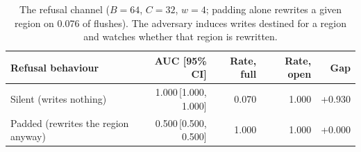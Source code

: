 \begin{table}[t]
\centering
\caption{The refusal channel ($B=64$, $C=32$, $w=4$;
padding alone rewrites a given region on 0.076 of flushes). The adversary
induces writes destined for a region and watches whether that region is rewritten.}
\label{tab:e9}
\small
\setlength{\tabcolsep}{4pt}
\begin{tabular}{lrrrr}
\toprule
Refusal behaviour & AUC [95\% CI] & Rate, full & Rate, open & Gap \\
\midrule
Silent (writes nothing) & 1.000\,[1.000, 1.000] & 0.070 & 1.000 & +0.930 \\
Padded (rewrites the region anyway) & 0.500\,[0.500, 0.500] & 1.000 & 1.000 & +0.000 \\
\bottomrule
\end{tabular}
\end{table}
